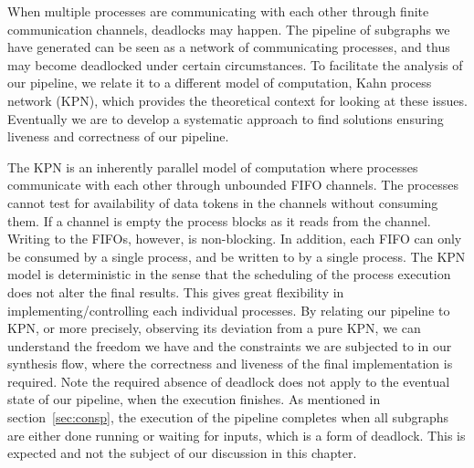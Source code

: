 
\label{liveprof}
When multiple processes are communicating with each other through finite communication channels, deadlocks may happen. The pipeline of subgraphs we have generated can be seen as a network
of communicating processes, and thus may become deadlocked under certain circumstances.
To facilitate the analysis of our pipeline, 
we relate it to a different model of computation, Kahn process network (KPN), which
provides the theoretical context for looking at these issues. Eventually we are to
develop a systematic approach to find solutions ensuring liveness and correctness of our pipeline.


The KPN is an inherently
parallel model of computation where processes communicate with
each other through unbounded FIFO channels. 
The processes cannot test for availability of data tokens in 
the channels without consuming them. If a channel is empty
the process blocks as it reads from the channel.
Writing to the FIFOs, however, is non-blocking.
In addition, each FIFO can only be consumed by a single process, and be written to by a single process. The KPN model is deterministic in the sense that the scheduling of
the process execution does not alter the final results. This gives great flexibility
in implementing/controlling each individual processes. 
By relating our pipeline to KPN, or more precisely, observing its deviation from a pure
KPN, we can understand the freedom we have and the constraints we are subjected
to in our synthesis flow, where the correctness and liveness of the final implementation is required. Note the required absence of deadlock does not
apply to the eventual state of our pipeline, when the execution finishes.
As mentioned in section~\ref{sec:consp}, the execution of the pipeline completes when all subgraphs are either done running or waiting for inputs, which is a form of deadlock. This is expected and not the subject of our discussion in this
chapter.




